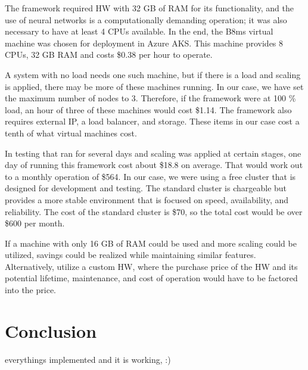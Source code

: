 The framework required HW with 32 GB of RAM for its functionality, and the use of neural networks is a computationally demanding operation; it was also necessary to have at least 4 CPUs available. In the end, the B8ms virtual machine was chosen for deployment in Azure AKS. This machine provides 8 CPUs, 32 GB RAM and costs \$0.38 per hour to operate. 

A system with no load needs one such machine, but if there is a load and scaling is applied, there may be more of these machines running. In our case, we have set the maximum number of nodes to 3. Therefore, if the framework were at 100 \% load, an hour of three of these machines would cost \$1.14. The framework also requires external IP, a load balancer, and storage. These items in our case cost a tenth of what virtual machines cost.

In testing that ran for several days and scaling was applied at certain stages, one day of running this framework cost about \$18.8 on average. That would work out to a monthly operation of \$564. In our case, we were using a free cluster that is designed for development and testing. The standard cluster is chargeable but provides a more stable environment that is focused on speed, availability, and reliability. The cost of the standard cluster is \$70, so the total cost would be over \$600 per month.

If a machine with only 16 GB of RAM could be used and more scaling could be utilized, savings could be realized while maintaining similar features. Alternatively, utilize a custom HW, where the purchase price of the HW and its potential lifetime, maintenance, and cost of operation would have to be factored into the price. 

\chapter{Conclusion}
everythings implemented and it is working, :)

